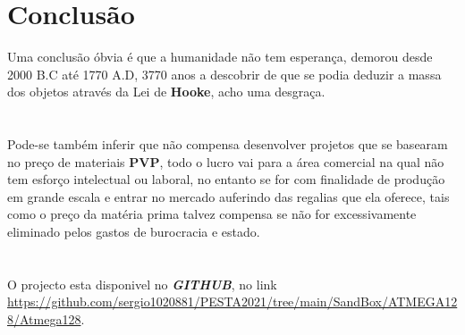 \chapter{Conclusão}
Uma conclusão óbvia é que a humanidade não tem esperança, demorou desde 2000 B.C até 1770 A.D, 3770 anos a descobrir de que se podia deduzir a massa dos objetos através da Lei de \textbf{Hooke}, acho uma desgraça. \\
\\
\\
Pode-se também inferir que não compensa desenvolver projetos que se basearam no preço de materiais \textbf{PVP}, todo o lucro vai para a área comercial na qual não tem esforço intelectual ou laboral, no entanto se for com finalidade de produção em grande escala e entrar no mercado auferindo das regalias que ela oferece, tais como o preço da matéria prima talvez compensa se não for excessivamente eliminado pelos gastos de burocracia e estado. \\
\\
\\
O projecto esta disponivel no \textit{\textbf{GITHUB}}, no link \url{https://github.com/sergio1020881/PESTA2021/tree/main/SandBox/ATMEGA128/Atmega128}.
